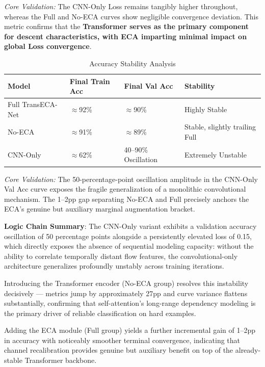 \documentclass[sigconf]{acmart}
\begin{document}
\textit{Core Validation:} The CNN-Only Loss remains tangibly higher throughout, whereas the Full and No-ECA curves show negligible convergence deviation. This metric confirms that the \textbf{Transformer serves as the primary component for descent characteristics, with ECA imparting minimal impact on global Loss convergence}.

\begin{table}[H]
\caption{Accuracy Stability Analysis}
\label{tab:acc_stab}
\begin{tabular}{llll}
\toprule
\textbf{Model} & \textbf{Final Train Acc} & \textbf{Final Val Acc} & \textbf{Stability} \\
\midrule
Full TransECA-Net & $\approx$92\% & $\approx$90\% & Highly Stable \\
No-ECA & $\approx$91\% & $\approx$89\% & Stable, slightly trailing Full \\
CNN-Only & $\approx$62\% & 40--90\% Oscillation & Extremely Unstable \\
\bottomrule
\end{tabular}
\end{table}

\textit{Core Validation:} The 50-percentage-point oscillation amplitude in the CNN-Only Val Acc curve exposes the fragile generalization of a monolithic convolutional mechanism. The 1--2pp gap separating No-ECA and Full precisely anchors the ECA's genuine but auxiliary marginal augmentation bracket.

\textbf{Logic Chain Summary}: The CNN-Only variant exhibits a validation accuracy oscillation of 50 percentage points alongside a persistently elevated loss of 0.15, which directly exposes the absence of sequential modeling capacity: without the ability to correlate temporally distant flow features, the convolutional-only architecture generalizes profoundly unstably across training iterations.

Introducing the Transformer encoder (No-ECA group) resolves this instability decisively --- metrics jump by approximately 27pp and curve variance flattens substantially, confirming that self-attention's long-range dependency modeling is the primary driver of reliable classification on hard examples.

Adding the ECA module (Full group) yields a further incremental gain of 1--2pp in accuracy with noticeably smoother terminal convergence, indicating that channel recalibration provides genuine but auxiliary benefit on top of the already-stable Transformer backbone.
\end{document}
